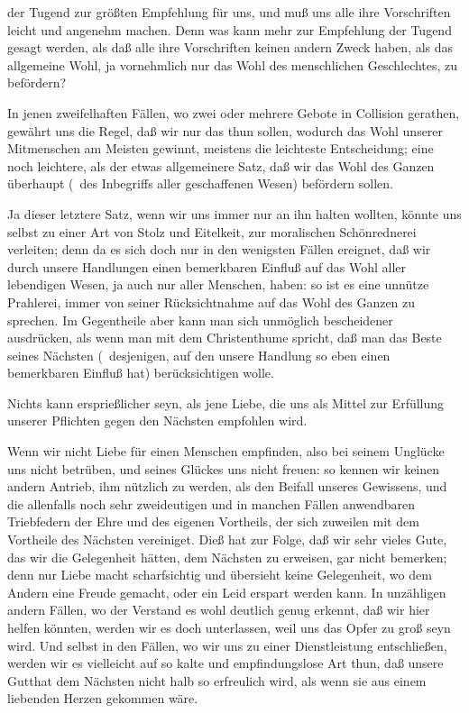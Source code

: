 \begin{aufza}
\begin{aufzb}
\begin{aufzc}
\item der Tugend zur größten Empfehlung für uns, und muß uns alle ihre Vorschriften leicht und angenehm machen. Denn was kann mehr zur Empfehlung der Tugend gesagt werden, als daß alle ihre Vorschriften keinen andern Zweck haben, als das allgemeine Wohl, ja vornehmlich nur das Wohl des menschlichen Geschlechtes, zu befördern?
\item In jenen zweifelhaften Fällen, wo zwei oder mehrere Gebote in Collision gerathen, gewährt uns die Regel, daß wir nur das thun sollen, wodurch das Wohl unserer Mitmenschen am Meisten gewinnt, meistens die leichteste Entscheidung; eine noch leichtere, als der etwas allgemeinere Satz, daß wir das Wohl des Ganzen überhaupt (\dh\ des Inbegriffs aller geschaffenen Wesen) befördern sollen.
\item Ja dieser letztere Satz, wenn wir uns immer nur an ihn halten wollten, könnte uns selbst zu einer Art von Stolz und Eitelkeit, zur moralischen Schönrednerei verleiten; denn da es sich doch nur in den wenigsten Fällen ereignet, daß wir durch unsere Handlungen einen bemerkbaren Einfluß auf das Wohl aller lebendigen Wesen, ja auch nur aller Menschen, haben: so ist es eine unnütze Prahlerei, immer von seiner Rücksichtnahme auf das Wohl des Ganzen zu sprechen. Im Gegentheile aber kann man sich unmöglich bescheidener ausdrücken, als wenn man mit dem Christenthume spricht, daß man das Beste seines Nächsten (\dh\  desjenigen, auf den unsere Handlung so eben einen bemerkbaren Einfluß hat) berücksichtigen wolle.~
\end{aufzc}
\item Nichts kann ersprießlicher seyn, als jene Liebe, die uns als Mittel zur Erfüllung unserer Pflichten gegen den Nächsten empfohlen wird.
\begin{aufzc}
\item Wenn wir nicht Liebe für einen Menschen empfinden, also bei seinem Unglücke uns nicht betrüben, und seines Glückes uns nicht freuen: so kennen wir keinen andern Antrieb, ihm nützlich zu werden, als den Beifall unseres Gewissens, und die allenfalls noch sehr zweideutigen und in manchen Fällen anwendbaren Triebfedern der Ehre und des eigenen Vortheils, der sich zuweilen mit dem Vortheile des Nächsten vereiniget. Dieß hat zur Folge, daß wir sehr vieles Gute, das wir die Gelegenheit hätten, dem Nächsten zu erweisen, gar nicht bemerken; denn nur Liebe macht scharfsichtig und übersieht keine Gelegenheit, wo dem Andern eine Freude gemacht, oder ein Leid erspart werden kann. In unzähligen andern Fällen, wo der Verstand es wohl deutlich genug erkennt, daß wir hier helfen könnten, werden wir es doch unterlassen, weil uns das Opfer zu groß seyn wird. Und selbst in den Fällen, wo wir uns zu einer Dienstleistung entschließen, werden wir es vielleicht auf so kalte und empfindungslose Art thun, daß unsere Gutthat dem Nächsten nicht halb so erfreulich wird, als wenn sie aus einem liebenden Herzen gekommen wäre.

\end{aufzc}
\end{aufzb}
\end{aufza}
